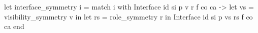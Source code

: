 let interface_symmetry i = match i with
   Interface id si p v r f co ca -> 
     let vs = visibility_symmetry v in
     let rs = role_symmetry r in
     Interface id si p vs rs f co ca end